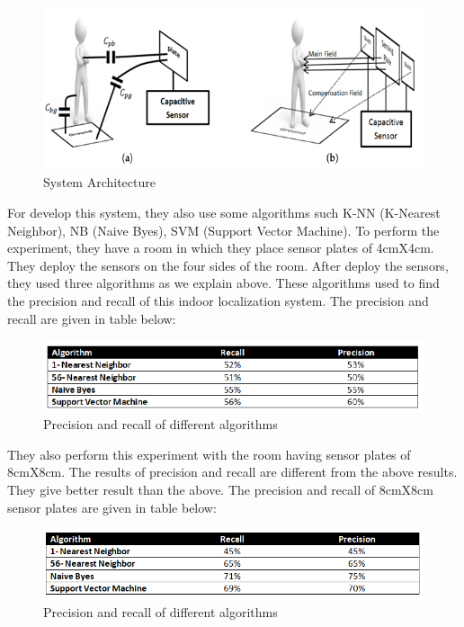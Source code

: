 \begin{figure}[h]
  		\centering
    		\includegraphics[scale=0.8]{./Figures/systemarchi}
\caption{System Architecture}
\label{fig:2}
 		\end{figure}
For develop this system, they also use some algorithms such K-NN (K-Nearest Neighbor), NB (Naive Byes), SVM (Support Vector Machine). To perform the experiment, they have a room in which they place sensor plates of 4cmX4cm. They deploy the sensors on the four sides of the room. After deploy the sensors, they used three algorithms as we explain above. These algorithms used to find the precision and recall of this indoor localization system. The precision and recall are given in table below:   

\begin{figure}[h]
  		\centering
    		\includegraphics[scale=0.9]{./Figures/pr1}
\caption{Precision and recall of different algorithms}
\label{fig:3}
 		\end{figure}

They also perform this experiment with the room having sensor plates of 8cmX8cm. The results of precision and recall are different from the above results. They give better result than the above. The precision and recall of 8cmX8cm sensor plates are given in table below:  

\begin{figure}[h]
  		\centering
    		\includegraphics[scale=0.75]{./Figures/pr2}
\caption{Precision and recall of different algorithms}
\label{fig:4}
 		\end{figure}

